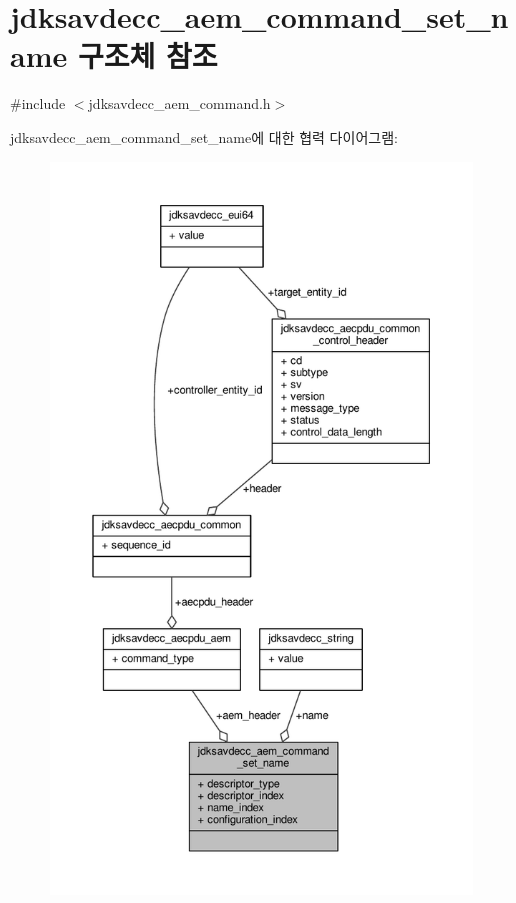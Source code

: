 \hypertarget{structjdksavdecc__aem__command__set__name}{}\section{jdksavdecc\+\_\+aem\+\_\+command\+\_\+set\+\_\+name 구조체 참조}
\label{structjdksavdecc__aem__command__set__name}


{\ttfamily \#include $<$jdksavdecc\+\_\+aem\+\_\+command.\+h$>$}



jdksavdecc\+\_\+aem\+\_\+command\+\_\+set\+\_\+name에 대한 협력 다이어그램\+:
\nopagebreak
\begin{figure}[H]
\begin{center}
\leavevmode
\includegraphics[height=550pt]{structjdksavdecc__aem__command__set__name__coll__graph}
\end{center}
\end{figure}
